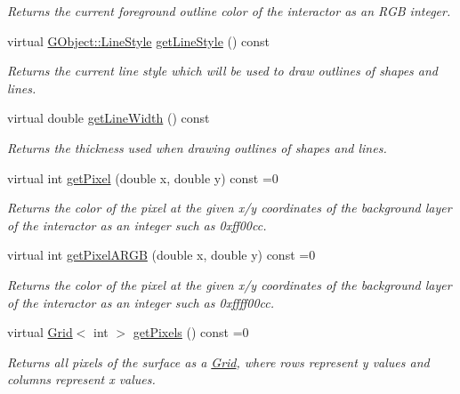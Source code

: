 \begin{DoxyCompactItemize}
\begin{DoxyCompactList}\small\item\em Returns the current foreground outline color of the interactor as an R\+GB integer. \end{DoxyCompactList}\item 
virtual \mbox{\hyperlink{classGObject_a86e0f5648542856159bb40775c854aa7}{G\+Object\+::\+Line\+Style}} \mbox{\hyperlink{classGDrawingSurface_aaf1f5ea8281e5e3486662878d26f0a13}{get\+Line\+Style}} () const
\begin{DoxyCompactList}\small\item\em Returns the current line style which will be used to draw outlines of shapes and lines. \end{DoxyCompactList}\item 
virtual double \mbox{\hyperlink{classGDrawingSurface_a85ff266dc3eb63d9f2d8e5a4487fd3c0}{get\+Line\+Width}} () const
\begin{DoxyCompactList}\small\item\em Returns the thickness used when drawing outlines of shapes and lines. \end{DoxyCompactList}\item 
virtual int \mbox{\hyperlink{classGDrawingSurface_a40f3e3f64a8263e13b7162e15b2979ee}{get\+Pixel}} (double x, double y) const =0
\begin{DoxyCompactList}\small\item\em Returns the color of the pixel at the given x/y coordinates of the background layer of the interactor as an integer such as 0xff00cc. \end{DoxyCompactList}\item 
virtual int \mbox{\hyperlink{classGDrawingSurface_aee10de1ca7da1fc3f3fc0e48286f88f8}{get\+Pixel\+A\+R\+GB}} (double x, double y) const =0
\begin{DoxyCompactList}\small\item\em Returns the color of the pixel at the given x/y coordinates of the background layer of the interactor as an integer such as 0xffff00cc. \end{DoxyCompactList}\item 
virtual \mbox{\hyperlink{classGrid}{Grid}}$<$ int $>$ \mbox{\hyperlink{classGDrawingSurface_a9811240b1241922153dec17d395797cf}{get\+Pixels}} () const =0
\begin{DoxyCompactList}\small\item\em Returns all pixels of the surface as a \mbox{\hyperlink{classGrid}{Grid}}, where rows represent y values and columns represent x values. \end{DoxyCompactList}\item 

\end{DoxyCompactItemize}
